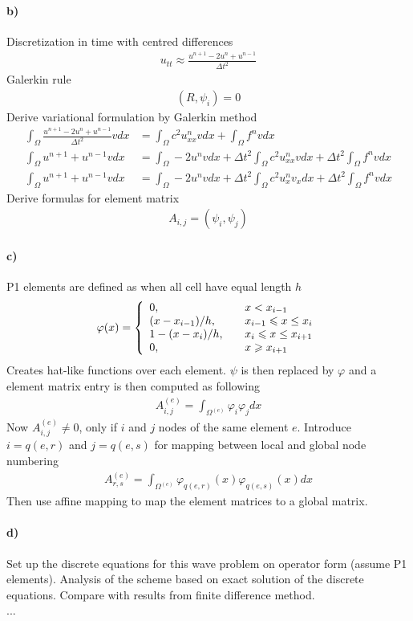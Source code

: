 \documentclass[11pt,a4paper]{article}
\begin{document}
\paragraph*{b)}
Discretization in time with centred differences
\begin{align}
u_{tt} \approx \frac{u^{n+1}-2u^{n}+u^{n-1}}{\Delta t^2}
\end{align}
Galerkin rule
\begin{align}
(R,\psi_i)=0
\end{align}
Derive variational formulation by Galerkin method
\begin{align*}
\int_\Omega \frac{u^{n+1}-2u^{n}+u^{n-1}}{\Delta t^2}vdx &= \int_\Omega c^2u^n_{xx}vdx + \int_\Omega f^nvdx \\
\int_\Omega u^{n+1}+u^{n-1}vdx &=\int_\Omega-2u^{n}vdx+ \Delta t^2\int_\Omega c^2u^n_{xx}vdx + \Delta t^2\int_\Omega f^nvdx\\
\int_\Omega u^{n+1}+u^{n-1}vdx &=\int_\Omega-2u^{n}vdx+ \Delta t^2\int_\Omega c^2u^n_{x}v_{x}dx + \Delta t^2\int_\Omega f^nvdx
\end{align*}
Derive formulas for element matrix
\begin{align}
A_{i,j} = (\psi_i,\psi_j)
\end{align}

\paragraph*{c)}
P1 elements are defined as when all cell have equal length $h$
\begin{equation}
\varphi(x) = \left\{ 
  \begin{array}{l l}
    0, & \quad x<x_{i-1}\\
    (x-x_{i-1})/h, & \quad x_{i-1}\leqslant x \leq x_{i}\\
    1-(x-x_{i})/h, & \quad x_{i}\leqslant x \leq x_{i+1}\\
    0, & \quad x\geqslant x_{i+1}
  \end{array} \right.
\end{equation}
Creates hat-like functions over each element. $\psi$ is then replaced by $\varphi$ and a element matrix entry is then computed as following
\begin{align}
A^{(e)}_{i,j}= \int_{\Omega^{(e)}} \varphi_i \varphi_j dx
\end{align}
Now $A^{(e)}_{i,j}\neq0$, only if $i$ and $j$ nodes of the same element $e$. Introduce $i = q(e,r)$ and $j = q(e,s)$ for mapping between local and global node numbering
\begin{align}
A^{(e)}_{r,s}= \int_{\Omega^{(e)}} \varphi_{q(e,r)}(x) \varphi_{q(e,s)}(x) dx
\end{align}
Then use affine mapping to map the element matrices to a global matrix.
\paragraph*{d)}
Set up the discrete equations for this wave problem on operator form (assume P1 elements). Analysis of the scheme based on exact solution of the discrete equations. Compare with results from finite difference method. \\

...
\end{document}
